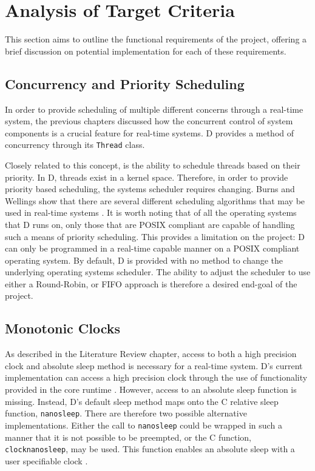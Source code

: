 \section{Analysis of Target Criteria} %
This section aims to outline the functional requirements of the project,
offering a brief discussion on potential implementation for each of these requirements. 

\subsection{Concurrency and Priority Scheduling} %
In order to provide scheduling of multiple different concerns through a
real-time system, the previous chapters discussed how the concurrent control of
system components is a crucial feature for real-time systems. D provides a
method of concurrency through its \texttt{Thread} class. 
\par\bigskip\noindent
Closely related to this concept, is the ability to schedule threads based on
their priority. In D, threads exist in a kernel space. Therefore, in order to
provide priority based scheduling, the systems scheduler requires changing. Burns
and Wellings show that there are several different scheduling algorithms that
may be used in real-time systems \cite{real-time-systems}. It is worth noting
that of all the operating systems that D runs on, only those that are POSIX
compliant are capable of handling such a means of priority scheduling. This
provides a limitation on the project: D can only be programmed in a real-time
capable manner on a POSIX compliant operating system.
By default, D is provided with no method to change the underlying operating
systems scheduler. 
The ability to adjust the scheduler to use either a Round-Robin, or FIFO approach 
is therefore a desired end-goal of the project.

\subsection{Monotonic Clocks} %
As described in the Literature Review chapter, access to both a high precision
clock and absolute sleep method is necessary for a real-time system. D's
current implementation can access a high precision clock through the use of
functionality provided in the core runtime \cite{dlang-core-time}. However,
access to an absolute sleep function is missing. Instead, D's default sleep
method maps onto the C relative sleep function, \texttt{nanosleep}. There are
therefore two possible alternative implementations. Either the call to
\texttt{nanosleep} could be wrapped in such a manner that it is not possible to be preempted, 
or the C function, \texttt{clock\textunderscore{}nanosleep}, may be used. This function enables 
an absolute sleep with a user specifiable clock \cite{clock-nanosleep}. 


